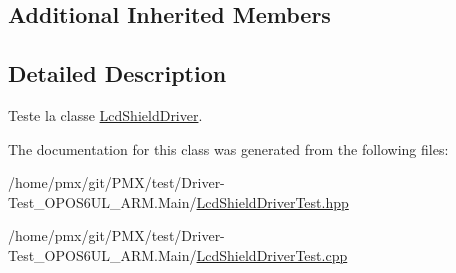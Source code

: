 \subsection*{Additional Inherited Members}


\subsection{Detailed Description}
Teste la classe \hyperlink{classLcdShieldDriver}{Lcd\+Shield\+Driver}. 

The documentation for this class was generated from the following files\+:\begin{DoxyCompactItemize}
\item 
/home/pmx/git/\+P\+M\+X/test/\+Driver-\/\+Test\+\_\+\+O\+P\+O\+S6\+U\+L\+\_\+\+A\+R\+M.\+Main/\hyperlink{LcdShieldDriverTest_8hpp}{Lcd\+Shield\+Driver\+Test.\+hpp}\item 
/home/pmx/git/\+P\+M\+X/test/\+Driver-\/\+Test\+\_\+\+O\+P\+O\+S6\+U\+L\+\_\+\+A\+R\+M.\+Main/\hyperlink{LcdShieldDriverTest_8cpp}{Lcd\+Shield\+Driver\+Test.\+cpp}\end{DoxyCompactItemize}
